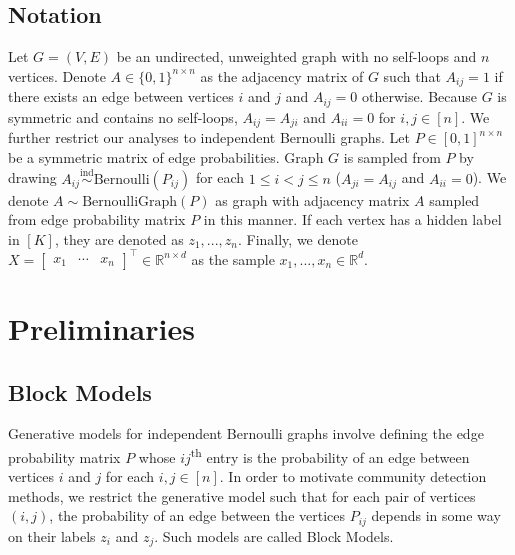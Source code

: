 \documentclass[
  11pt,
]{article}
\begin{document}
\hypertarget{notation}{%
\subsection{Notation}\label{notation}}

Let \(G = (V, E)\) be an undirected, unweighted graph with no self-loops
and \(n\) vertices. Denote \(A \in \{0, 1\}^{n \times n}\) as the
adjacency matrix of \(G\) such that \(A_{ij} = 1\) if there exists an
edge between vertices \(i\) and \(j\) and \(A_{ij} = 0\) otherwise.
Because \(G\) is symmetric and contains no self-loops,
\(A_{ij} = A_{ji}\) and \(A_{ii} = 0\) for \(i, j \in [n]\). We further
restrict our analyses to independent Bernoulli graphs. Let
\(P \in [0, 1]^{n \times n}\) be a symmetric matrix of edge
probabilities. Graph \(G\) is sampled from \(P\) by drawing
\(A_{ij} \stackrel{\text{ind}}{\sim}\text{Bernoulli}(P_{ij})\) for each
\(1 \leq i < j \leq n\) (\(A_{ji} = A_{ij}\) and \(A_{ii} = 0\)). We
denote \(A \sim \text{BernoulliGraph}(P)\) as graph with adjacency
matrix \(A\) sampled from edge probability matrix \(P\) in this manner.
If each vertex has a hidden label in \([K]\), they are denoted as
\(z_1, ..., z_n\). Finally, we denote
\(X = \begin{bmatrix} x_1 & \cdots & x_n \end{bmatrix}^\top \in \mathbb{R}^{n \times d}\)
as the sample \(x_1, ..., x_n \in \mathbb{R}^d\).

\hypertarget{preliminaries}{%
\section{Preliminaries}\label{preliminaries}}

\hypertarget{block-models}{%
\subsection{Block Models}\label{block-models}}

Generative models for independent Bernoulli graphs involve defining the
edge probability matrix \(P\) whose \(ij\)\textsuperscript{th} entry is
the probability of an edge between vertices \(i\) and \(j\) for each
\(i, j \in [n]\). In order to motivate community detection methods, we
restrict the generative model such that for each pair of vertices
\((i, j)\), the probability of an edge between the vertices \(P_{ij}\)
depends in some way on their labels \(z_i\) and \(z_j\). Such models are
called Block Models.
\end{document}
